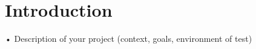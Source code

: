 \chapter{Introduction}

• Description of your project (context, goals, environment of test)


\cite{CernBiodiversity}
